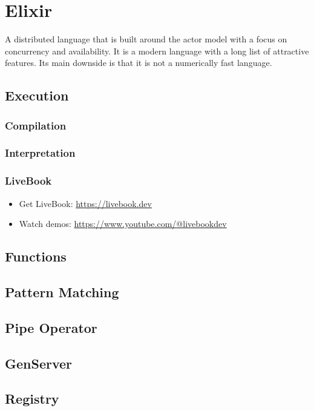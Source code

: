 \section{Elixir}

A distributed language that is built around the actor model with a focus on concurrency and availability. It is a modern language with a long list of attractive features. Its main downside is that it is not a numerically fast language.

\subsection{Execution}
\subsubsection{Compilation}
\subsubsection{Interpretation}
\subsubsection{LiveBook}

\begin{itemize}
  \item Get LiveBook: \url{https://livebook.dev}
  \item Watch demos: \url{https://www.youtube.com/@livebookdev}
\end{itemize}

\subsection{Functions}

\subsection{Pattern Matching}

\subsection{Pipe Operator}

\subsection{GenServer}

\subsection{Registry}

